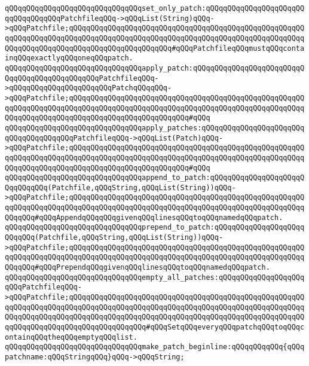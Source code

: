 \verb|qQQqqQQqqQQqqQQqqQQqqQQqqQQqqQQqset_only_patch:qQQqqQQqqQQqqQQqqQQqqQQqqQQqqQQqqQQqPatchfileqQQq->qQQqList(String)qQQq->qQQqPatchfile;qQQqqQQqqQQqqQQqqQQqqQQqqQQqqQQqqQQqqQQqqQQqqQQqqQQqqQQqqQQqqQQqqQQqqQQqqQQqqQQqqQQqqQQqqQQqqQQqqQQqqQQqqQQqqQQqqQQqqQQqqQQqqQQqqQQqqQQqqQQqqQQqqQQqqQQqqQQqqQQqqQQq#qQQqPatchfileqQQqmustqQQqcontainqQQqexactlyqQQqoneqQQqpatch.|\newline
\newline
\verb|qQQqqQQqqQQqqQQqqQQqqQQqqQQqqQQqapply_patch:qQQqqQQqqQQqqQQqqQQqqQQqqQQqqQQqqQQqqQQqqQQqqQQqPatchfileqQQq->qQQqqQQqqQQqqQQqqQQqqQQqPatchqQQqqQQq->qQQqPatchfile;qQQqqQQqqQQqqQQqqQQqqQQqqQQqqQQqqQQqqQQqqQQqqQQqqQQqqQQqqQQqqQQqqQQqqQQqqQQqqQQqqQQqqQQqqQQqqQQqqQQqqQQqqQQqqQQqqQQqqQQqqQQqqQQqqQQqqQQqqQQqqQQqqQQqqQQqqQQqqQQqqQQqqQQq#qQQq|\newline
\verb|qQQqqQQqqQQqqQQqqQQqqQQqqQQqqQQqapply_patches:qQQqqQQqqQQqqQQqqQQqqQQqqQQqqQQqqQQqqQQqPatchfileqQQq->qQQqList(Patch)qQQq->qQQqPatchfile;qQQqqQQqqQQqqQQqqQQqqQQqqQQqqQQqqQQqqQQqqQQqqQQqqQQqqQQqqQQqqQQqqQQqqQQqqQQqqQQqqQQqqQQqqQQqqQQqqQQqqQQqqQQqqQQqqQQqqQQqqQQqqQQqqQQqqQQqqQQqqQQqqQQqqQQqqQQqqQQqqQQqqQQq#qQQq|\newline
\newline
\verb|qQQqqQQqqQQqqQQqqQQqqQQqqQQqqQQqappend_to_patch:qQQqqQQqqQQqqQQqqQQqqQQqqQQqqQQq(Patchfile,qQQqString,qQQqList(String))qQQq->qQQqPatchfile;qQQqqQQqqQQqqQQqqQQqqQQqqQQqqQQqqQQqqQQqqQQqqQQqqQQqqQQqqQQqqQQqqQQqqQQqqQQqqQQqqQQqqQQqqQQqqQQqqQQqqQQqqQQqqQQqqQQqqQQqqQQqqQQqqQQq#qQQqAppendqQQqqQQqgivenqQQqlinesqQQqtoqQQqnamedqQQqpatch.|\newline
\verb|qQQqqQQqqQQqqQQqqQQqqQQqqQQqqQQqprepend_to_patch:qQQqqQQqqQQqqQQqqQQqqQQqqQQq(Patchfile,qQQqString,qQQqList(String))qQQq->qQQqPatchfile;qQQqqQQqqQQqqQQqqQQqqQQqqQQqqQQqqQQqqQQqqQQqqQQqqQQqqQQqqQQqqQQqqQQqqQQqqQQqqQQqqQQqqQQqqQQqqQQqqQQqqQQqqQQqqQQqqQQqqQQqqQQqqQQqqQQq#qQQqPrependqQQqgivenqQQqlinesqQQqtoqQQqnamedqQQqpatch.|\newline
\newline
\verb|qQQqqQQqqQQqqQQqqQQqqQQqqQQqqQQqempty_all_patches:qQQqqQQqqQQqqQQqqQQqqQQqPatchfileqQQq->qQQqPatchfile;qQQqqQQqqQQqqQQqqQQqqQQqqQQqqQQqqQQqqQQqqQQqqQQqqQQqqQQqqQQqqQQqqQQqqQQqqQQqqQQqqQQqqQQqqQQqqQQqqQQqqQQqqQQqqQQqqQQqqQQqqQQqqQQqqQQqqQQqqQQqqQQqqQQqqQQqqQQqqQQqqQQqqQQqqQQqqQQqqQQqqQQqqQQqqQQqqQQqqQQqqQQqqQQqqQQqqQQqqQQqqQQqqQQq#qQQqSetqQQqeveryqQQqpatchqQQqtoqQQqcontainqQQqtheqQQqemptyqQQqlist.|\newline
\newline
\verb|qQQqqQQqqQQqqQQqqQQqqQQqqQQqqQQqmake_patch_beginline:qQQqqQQqqQQq{qQQqpatchname:qQQqStringqQQq}qQQq->qQQqString;|\newline
